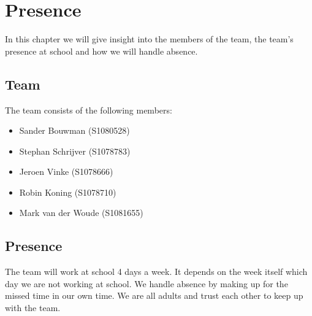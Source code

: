 \section{Presence}
In this chapter we will give insight into the members of the team, the team's presence at school and how we will handle absence.

\subsection{Team}
The team consists of the following members:
\begin{itemize}
  \item Sander Bouwman (S1080528)
  \item Stephan Schrijver (S1078783)
  \item Jeroen Vinke (S1078666)
  \item Robin Koning (S1078710)
  \item Mark van der Woude (S1081655)
\end{itemize}
\subsection{Presence}
The team will work at school 4 days a week. It depends on the week itself which day we are not working at school. We handle absence by making up for the missed time in our own time. We are all adults and trust each other to keep up with the team.



